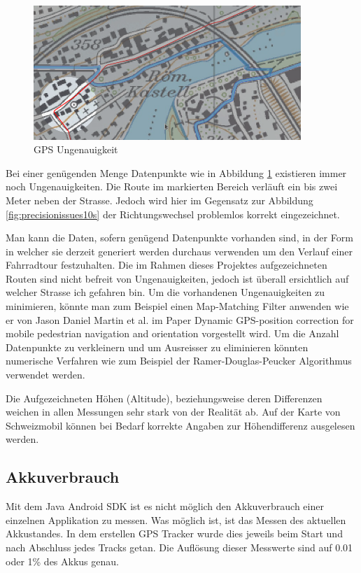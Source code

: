 \begin{figure}[h]
  \centering
  \includegraphics[width=0.9\textwidth]{images/map_issues_1s.png}
  \caption[GPS Ungenauigkeit]{GPS Ungenauigkeit}
  \label{fig:precisionissues1s}
\end{figure}

Bei einer genügenden Menge Datenpunkte wie in Abbildung \ref{fig:precisionissues1s} existieren immer noch Ungenauigkeiten. Die Route im markierten Bereich verläuft ein bis zwei Meter neben der Strasse. Jedoch wird hier im Gegensatz zur Abbildung \ref{fig:precisionissues10s} der Richtungswechsel problemlos korrekt eingezeichnet.

Man kann die Daten, sofern genügend Datenpunkte vorhanden sind, in der Form in welcher sie derzeit generiert werden durchaus verwenden um den Verlauf einer Fahrradtour festzuhalten. Die im Rahmen dieses Projektes aufgezeichneten Routen sind nicht befreit von Ungenauigkeiten, jedoch ist überall ersichtlich auf welcher Strasse ich gefahren bin. Um die vorhandenen Ungenauigkeiten zu minimieren, könnte man zum Beispiel einen  Map-Matching Filter anwenden wie er von Jason Daniel Martin et al. im Paper Dynamic GPS-position correction for mobile pedestrian navigation and orientation \cite{gpscorrection} vorgestellt wird. Um die Anzahl Datenpunkte zu verkleinern und um Ausreisser zu eliminieren könnten numerische Verfahren wie zum Beispiel der Ramer-Douglas-Peucker Algorithmus \cite{ramer}\cite{douglaspeucker} verwendet werden.

Die Aufgezeichneten Höhen (Altitude), beziehungsweise deren Differenzen weichen in allen Messungen sehr stark von der Realität ab. Auf der Karte von Schweizmobil\cite{velolandmap} können bei Bedarf korrekte Angaben zur Höhendifferenz ausgelesen werden.

\subsection{Akkuverbrauch}
\label{subsec:analysebatteryusage}
Mit dem Java Android SDK ist es nicht möglich den Akkuverbrauch einer einzelnen Applikation zu messen. Was möglich ist, ist das Messen des aktuellen Akkustandes. In dem erstellen GPS Tracker wurde dies jeweils beim Start und nach Abschluss jedes Tracks getan. Die Auflösung dieser Messwerte sind auf 0.01 oder 1\% des Akkus genau.

